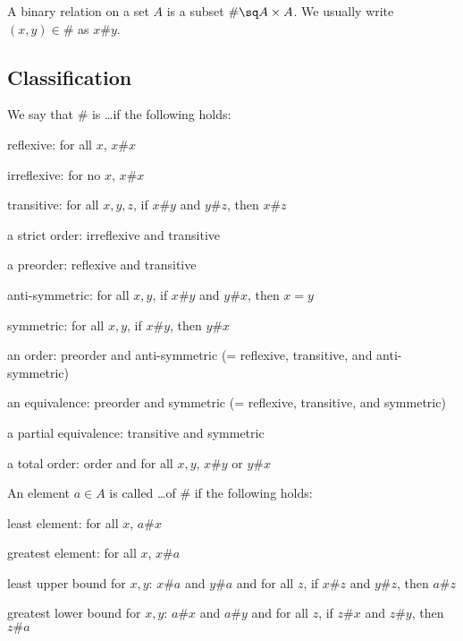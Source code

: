 A binary relation on a set $A$ is a subset $\#\sq A\times A$.
We usually write $(x,y)\in\#$ as $x\# y$.

\subsection{Classification}

\begin{definition}\label{def:math:binrel}
We say that $\#$ is \ldots if the following holds:
 \begin{compactitem}
 \item reflexive:  for all $x$, $x\# x$
 \item irreflexive:  for no $x$, $x\# x$
 \item transitive: for all $x,y,z$, if $x\# y$ and $y\# z$, then $x\# z$
 \item a strict order: irreflexive and transitive
 \item a preorder: reflexive and transitive
 \item anti-symmetric: for all $x,y$, if $x\# y$ and $y\# x$, then $x=y$
 \item symmetric: for all $x,y$, if $x\# y$, then $y\# x$
 \item an order\footnotemark: preorder and anti-symmetric (= reflexive, transitive, and anti-symmetric)
 \item an equivalence: preorder and symmetric (= reflexive, transitive, and symmetric)
 \item a partial equivalence: transitive and symmetric
 \item a total order: order and for all $x,y$, $x\# y$ or $y\# x$
 \end{compactitem}

An element $a\in A$ is called \ldots of $\#$ if the following holds:
 \begin{compactitem}
  \item least element:  for all $x$, $a\# x$
  \item greatest element: for all $x$, $x\# a$
  \item least upper bound for $x,y$: $x\# a$ and $y\# a$ and for all $z$, if $x\# z$ and $y\# z$, then $a\# z$
  \item greatest lower bound for $x,y$: $a\# x$ and $a\# y$ and for all $z$, if $z\# x$ and $z\# y$, then $z\# a$
 \end{compactitem}
\end{definition}

